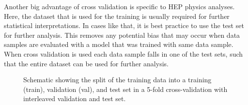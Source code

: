 Another big advantage of cross validation is specific to HEP physics analyses. 
Here, the dataset that is used for the training is usually required for further statistical interpretations. In cases like that, it is best practice to use the test set for further analysis. This removes any potential bias that may occur when data samples are evaluated with a model that was trained with same data sample.
When cross validation is used each data sample falls in one of the test sets, such that the entire dataset can be used for further analysis.

\begin{figure}[t]
    \caption{Schematic showing the split of the training data into a training (train), validation (val), and test set in a 5-fold cross-validation with interleaved validation and test set.}
    \label{fig:k-fold-method}
\end{figure}
